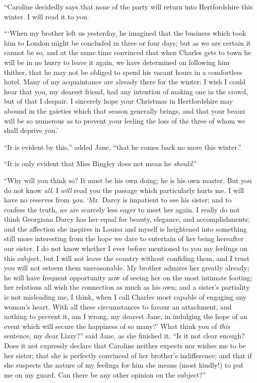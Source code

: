 \documentclass[12pt]{book}
\begin{document}
``Caroline decidedly says that none of the party will return into Hertfordshire this winter. I will read it to you.

```When my brother left us yesterday, he imagined that the business which took him to London might be concluded in three or four days; but as we are certain it cannot be so, and at the same time convinced that when Charles gets to town he will be in no hurry to leave it again, we have determined on following him thither, that he may not be obliged to spend his vacant hours in a comfortless hotel. Many of my acquaintance are already there for the winter: I wish I could hear that you, my dearest friend, had any intention of making one in the crowd, but of that I despair. I sincerely hope your Christmas in Hertfordshire may abound in the gaieties which that season generally brings, and that your beaux will be so numerous as to prevent your feeling the loss of the three of whom we shall deprive you.'

``It is evident by this,'' added Jane, ``that he comes back no more this winter.''

``It is only evident that Miss Bingley does not mean he \textit{should}.''

``Why will you think so? It must be his own doing; he is his own master. But you do not know \textit{all}. I \textit{will} read you the passage which particularly hurts me. I will have no reserves from \textit{you}. `Mr. Darcy is impatient to see his sister; and to confess the truth, \textit{we} are scarcely less eager to meet her again. I really do not think Georgiana Darcy has her equal for beauty, elegance, and accomplishments; and the affection she inspires in Louisa and myself is heightened into something still more interesting from the hope we dare to entertain of her being hereafter our sister. I do not know whether I ever before mentioned to you my feelings on this subject, but I will not leave the country without confiding them, and I trust you will not esteem them unreasonable. My brother admires her greatly already; he will have frequent opportunity now of seeing her on the most intimate footing; her relations all wish the connection as much as his own; and a sister's partiality is not misleading me, I think, when I call Charles most capable of engaging any woman's heart. With all these circumstances to favour an attachment, and nothing to prevent it, am I wrong, my dearest Jane, in indulging the hope of an event which will secure the happiness of so many?' What think you of \textit{this} sentence, my dear Lizzy?'' said Jane, as she finished it. ``Is it not clear enough? Does it not expressly declare that Caroline neither expects nor wishes me to be her sister; that she is perfectly convinced of her brother's indifference; and that if she suspects the nature of my feelings for him she means (most kindly!) to put me on my guard. Can there be any other opinion on the subject?''
\end{document}
